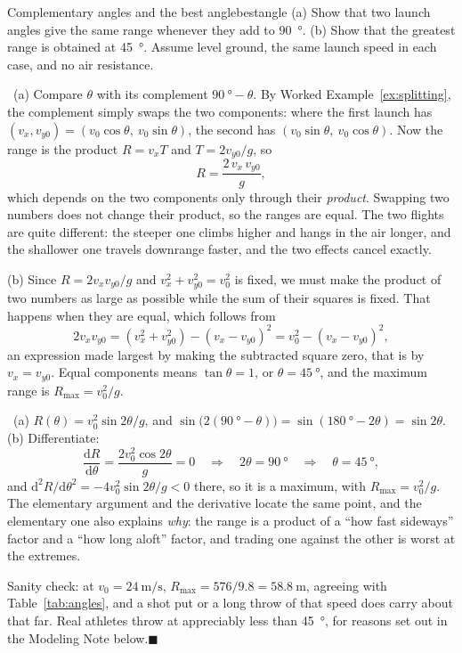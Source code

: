 \documentclass[11pt,twoside,openany]{book}
\newcommand{\dd}{\mathrm{d}}
\newcommand{\deriv}[2]{\frac{\dd #1}{\dd #2}}
\newcounter{check}[chapter]
\newcommand{\viewtag}[3]{\fcolorbox{#2}{#3}{\footnotesize\textbf{\textcolor{#2}{#1}}}}
\newcommand{\elemtag}{\viewtag{Elementary}{elemcol}{elempale}}
\newcommand{\calctag}{\viewtag{Calculus}{calccol}{calcpale}}
\newcommand{\elem}{\par\medskip\noindent\elemtag\ }
\newcommand{\calc}{\par\medskip\noindent\calctag\ }
\newcommand{\qed}{\hfill$\blacksquare$}
\begin{document}
\begin{example}{Complementary angles and the best angle}{bestangle}
(a) Show that two launch angles give the same range whenever they add to \SI{90}{\degree}. (b) Show that the greatest range is obtained at \SI{45}{\degree}. Assume level ground, the same launch speed in each case, and no air resistance.

\elem (a) Compare $\theta$ with its complement $\SI{90}{\degree} - \theta$. By Worked Example~\ref{ex:splitting}, the complement simply swaps the two components: where the first launch has $(v_x, v_{y0}) = (v_0\cos\theta,\ v_0\sin\theta)$, the second has $(v_0\sin\theta,\ v_0\cos\theta)$. Now the range is the product $R = v_x T$ and $T = 2v_{y0}/g$, so
\[
R = \frac{2\,v_x\,v_{y0}}{g},
\]
which depends on the two components only through their \emph{product}. Swapping two numbers does not change their product, so the ranges are equal. The two flights are quite different: the steeper one climbs higher and hangs in the air longer, and the shallower one travels downrange faster, and the two effects cancel exactly.

(b) Since $R = 2v_xv_{y0}/g$ and $v_x^2 + v_{y0}^2 = v_0^2$ is fixed, we must make the product of two numbers as large as possible while the sum of their squares is fixed. That happens when they are equal, which follows from
\[
2v_xv_{y0} = \left(v_x^{2}+v_{y0}^{2}\right) - \left(v_x - v_{y0}\right)^{2} = v_0^{2} - \left(v_x - v_{y0}\right)^{2},
\]
an expression made largest by making the subtracted square zero, that is by $v_x = v_{y0}$. Equal components means $\tan\theta = 1$, or $\theta = \SI{45}{\degree}$, and the maximum range is $R_{\max} = v_0^2/g$.

\calc (a) $R(\theta) = v_0^2\sin 2\theta/g$, and $\sin\big(2(\SI{90}{\degree}-\theta)\big) = \sin(\SI{180}{\degree} - 2\theta) = \sin 2\theta$. (b) Differentiate:
\[
\deriv{R}{\theta} = \frac{2v_0^{2}\cos 2\theta}{g} = 0 \quad\Longrightarrow\quad 2\theta = \SI{90}{\degree} \quad\Longrightarrow\quad \theta = \SI{45}{\degree},
\]
and $\dd^2R/\dd\theta^2 = -4v_0^2\sin2\theta/g < 0$ there, so it is a maximum, with $R_{\max} = v_0^2/g$. The elementary argument and the derivative locate the same point, and the elementary one also explains \emph{why}: the range is a product of a ``how fast sideways'' factor and a ``how long aloft'' factor, and trading one against the other is worst at the extremes.

Sanity check: at $v_0 = \SI{24}{\metre\per\second}$, $R_{\max} = 576/9.8 = \SI{58.8}{\metre}$, agreeing with Table~\ref{tab:angles}, and a shot put or a long throw of that speed does carry about that far. Real athletes throw at appreciably less than \SI{45}{\degree}, for reasons set out in the Modeling Note below.\qed
\end{example}
\end{document}

